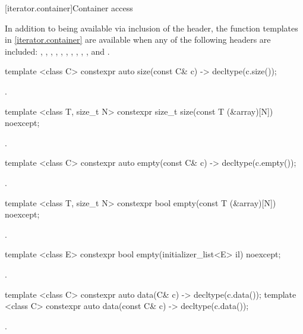 [iterator.container]{Container access}

\pnum
In addition to being available via inclusion of the  header,
the function templates in \ref{iterator.container} are available
when any of the following headers are included:
, , , ,
, , , ,
, , and .

\begin{itemdecl}
template <class C> constexpr auto size(const C& c) -> decltype(c.size());
\end{itemdecl}
\begin{itemdescr}
\pnum \returns {}.
\end{itemdescr}

\begin{itemdecl}
template <class T, size_t N> constexpr size_t size(const T (&array)[N]) noexcept;
\end{itemdecl}
\begin{itemdescr}
\pnum \returns {}.
\end{itemdescr}

\begin{itemdecl}
template <class C> constexpr auto empty(const C& c) -> decltype(c.empty());
\end{itemdecl}
\begin{itemdescr}
\pnum \returns {}.
\end{itemdescr}

\begin{itemdecl}
template <class T, size_t N> constexpr bool empty(const T (&array)[N]) noexcept;
\end{itemdecl}
\begin{itemdescr}
\pnum \returns {}.
\end{itemdescr}

\begin{itemdecl}
template <class E> constexpr bool empty(initializer_list<E> il) noexcept;
\end{itemdecl}
\begin{itemdescr}
\pnum \returns {}.
\end{itemdescr}

\begin{itemdecl}
template <class C> constexpr auto data(C& c) -> decltype(c.data());
template <class C> constexpr auto data(const C& c) -> decltype(c.data());
\end{itemdecl}
\begin{itemdescr}
\pnum \returns {}.
\end{itemdescr}

